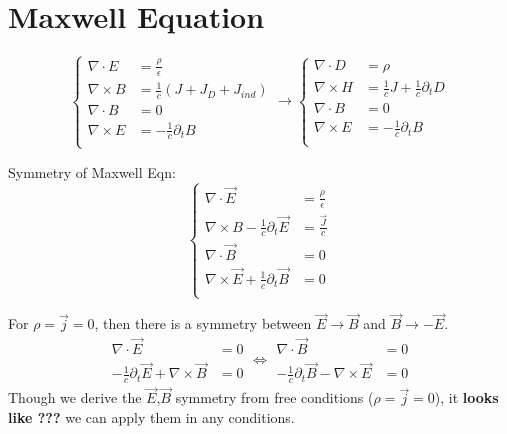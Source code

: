 \section{Maxwell Equation}
\begin{equation}
    \label{eqn:Maxwell}
    \left\{
    \begin{aligned}
	\nabla\cdot{E} &= \frac{\rho}{\epsilon}	\\
	\nabla\times{B} &= \frac{1}{c}\left(J + J_D + J_{ind}\right)	\\
	\nabla\cdot{B} &= 0  \\
	\nabla\times{E} &= -\frac{1}{c}\partial_{t}B	\\
    \end{aligned}
    \right.
    \longrightarrow
    \left\{
    \begin{aligned}
	\nabla\cdot{D} &= \rho	\\
	\nabla\times{H} &= \frac{1}{c}J +\frac{1}{c}\partial_{t}D    \\
	\nabla\cdot{B} &= 0  \\
	\nabla\times{E} &= -\frac{1}{c}\partial_{t}B	\\
    \end{aligned}
    \right.
\end{equation}

Symmetry of Maxwell Eqn:
\begin{equation}
    \label{eqn:symmetric_Maxwell}
    \left\{
    \begin{aligned}
	\nabla\cdot\vec{E} &= \frac{\rho}{\epsilon}	\\
	\nabla\times{B} - \frac{1}{c}\partial_t\vec{E} &= \frac{\vec{J}}{c} 	\\
	\nabla\cdot\vec{B} &= 0  \\
	\nabla\times\vec{E} + \frac{1}{c}\partial_{t}\vec{B} &= 0       \\
    \end{aligned}
    \right.
\end{equation}

For $\rho = \vec{j} = 0$, then there is a symmetry between $\vec{E} \rightarrow \vec{B}$ 
and $\vec{B} \rightarrow -\vec{E}$.
\[
    \begin{aligned}
	\nabla\cdot\vec{E} &= 0	\\
	-\frac{1}{c}\partial_t\vec{E} + \nabla\times\vec{B} &= 0
    \end{aligned}
    \Longleftrightarrow
    \begin{aligned}
	\nabla\cdot\vec{B} &= 0	\\
	-\frac{1}{c}\partial_t\vec{B} - \nabla\times\vec{E} &= 0
    \end{aligned}
\]
Though we derive the $\vec{E}$,$\vec{B}$ symmetry from free conditions ($\rho = \vec{j} = 0$),
it \textbf{looks like ???} we can apply them in any conditions.

